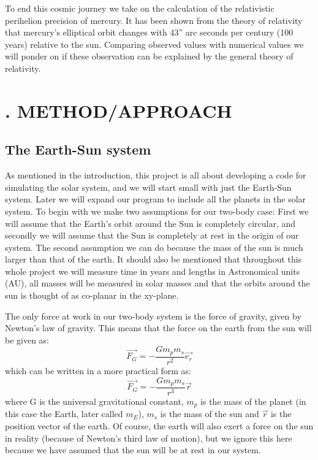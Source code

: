 \documentclass[twocolumn]{article}
\begin{document}
To end this cosmic journey we take on the calculation of the relativistic perihelion precision of mercury. It has been shown from the theory of relativity that mercury's elliptical orbit changes with 43'' arc seconds per century (100 years) relative to the sun. Comparing observed values with numerical values we will ponder on if these observation can be explained by the general theory of relativity.     
\section*{. METHOD/APPROACH}

\subsection*{The Earth-Sun system}
As mentioned in the introduction, this project is all about developing a code for simulating the solar system, and we will start small with just the Earth-Sun system. Later we will expand our program to include all the planets in the solar system.\newline
To begin with we make two assumptions for our two-body case: First we will assume that the Earth's orbit around the Sun is completely circular, and secondly we will assume that the Sun is completely at rest in the origin of our system. The second assumption we can do because the mass of the sun is much larger than that of the earth. It should also be mentioned that throughout this whole project we will measure time in years and lengths in Astronomical units (AU), all masses will be measured in solar masses and that the orbits around the sun is thought of as co-planar in the xy-plane.
\newline

The only force at work in our two-body system is the force of gravity, given by Newton's law of gravity. This means that the force on the earth from the sun will be given as:
$$\vec{F_G} = -\frac{Gm_{p}m_{s}}{r^2}\vec{e_{r}}$$
which can be written in a more practical form as:
$$\vec{F_G} = -\frac{Gm_{p}m_{s}}{r^3}\vec{r}$$
where G is the universal gravitational constant, $m_p$ is the mass of the planet (in this case the Earth, later called $m_E$), $m_s$ is the mass of the sun and $\vec{r}$ is the position vector of the earth. Of course, the earth will also exert a force on the sun in reality (because of Newton's third law of motion), but we ignore this here because we have assumed that the sun will be at rest in our system.
\newline
\end{document}
